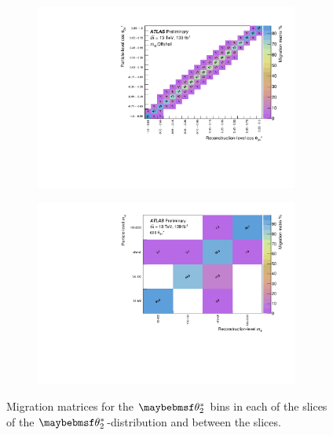 \begin{figure}[htb]
  \begin{subfigure}{.49\textwidth}\centering\includegraphics[width = 0.95\textwidth]{Figures/m4l/UnfoldingStudies/v014_matrices/cosThetaStar3_m4loffshellMatrix.pdf}\end{subfigure}
  \begin{subfigure}{.49\textwidth}\centering\includegraphics[width = 0.95\textwidth]{Figures/m4l/UnfoldingStudies/v014_matrices/cosThetaStar3_m4lMatrix.pdf}\end{subfigure}
\caption{Migration matrices for the $\thetastar_{2}$ bins in each of the \mFourL slices of the $\thetastar_{2}$-\mFourL distribution and between the slices.}
 \end{figure}

\FloatBarrier


